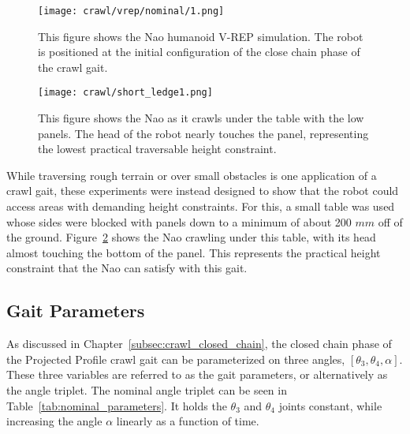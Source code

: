 \begin{figure}
  \centering
  \texttt{[image: crawl/vrep/nominal/1.png]}
  \caption{This figure shows the Nao humanoid V-REP simulation. 
           The robot is positioned at the initial configuration of the close chain phase
           of the crawl gait.}
  \label{fig:vrep_nao_nom_gait_single_frame1}
\end{figure}

\begin{figure}
  \centering
  \texttt{[image: crawl/short\_ledge1.png]}
  \caption{This figure shows the Nao as it crawls under the table with the low panels.
           The head of the robot nearly touches the panel,
           representing the lowest practical traversable height constraint.}
  \label{fig:short_ledge_nao_nom_gait_single_frame1}
\end{figure}

While traversing rough terrain or over small obstacles is one application of a crawl gait,
these experiments were instead designed to show that the robot could access areas with
demanding height constraints. For this, a small table was used whose sides were blocked
with panels down to a minimum of about 200 $mm$ off of the ground. 
Figure~\ref{fig:short_ledge_nao_nom_gait_single_frame1} shows the Nao crawling under this table,
with its head almost touching the bottom of the panel. This represents the practical height
constraint that the Nao can satisfy with this gait.


\FloatBarrier
\subsection{Gait Parameters} \label{subsec:gait_params}
As discussed in Chapter~\ref{subsec:crawl_closed_chain}, the closed chain phase of the 
Projected Profile crawl gait can be parameterized on three angles, $[\theta_3, \theta_4, \alpha]$.
These three variables are referred to as the gait parameters, or alternatively as the angle triplet.
The nominal angle triplet can be seen in Table~\ref{tab:nominal_parameters}. It holds the 
$\theta_3$ and $\theta_4$ joints constant, while increasing the angle $\alpha$ linearly as a function of time.

